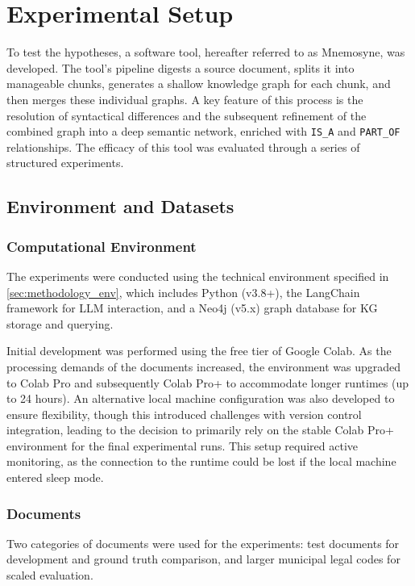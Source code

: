 \section{Experimental Setup}
\label{sec:exp_setup}

To test the hypotheses, a software tool, hereafter referred to as Mnemosyne, was developed. The tool's pipeline digests a source document, splits it into manageable chunks, generates a shallow knowledge graph for each chunk, and then merges these individual graphs. A key feature of this process is the resolution of syntactical differences and the subsequent refinement of the combined graph into a deep semantic network, enriched with \texttt{IS\_A} and \texttt{PART\_OF} relationships. The efficacy of this tool was evaluated through a series of structured experiments.

\subsection{Environment and Datasets}
\label{subsec:env_data}

\subsubsection{Computational Environment}

The experiments were conducted using the technical environment specified in \cref{sec:methodology_env}, which includes Python (v3.8+), the LangChain framework for LLM interaction, and a Neo4j (v5.x) graph database for KG storage and querying.

Initial development was performed using the free tier of Google Colab. As the processing demands of the documents increased, the environment was upgraded to Colab Pro and subsequently Colab Pro+ to accommodate longer runtimes (up to 24 hours). An alternative local machine configuration was also developed to ensure flexibility, though this introduced challenges with version control integration, leading to the decision to primarily rely on the stable Colab Pro+ environment for the final experimental runs. This setup required active monitoring, as the connection to the runtime could be lost if the local machine entered sleep mode.

\subsubsection{Documents}
Two categories of documents were used for the experiments: test documents for development and ground truth comparison, and larger municipal legal codes for scaled evaluation.

